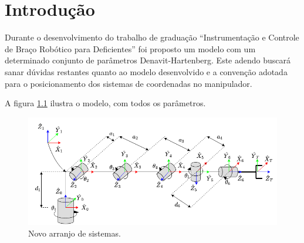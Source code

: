 \chapter{Introdução}

\label{CapIntro}

Durante o desenvolvimento do trabalho de graduação ``Instrumentação e Controle de Braço Robótico para Deficientes'' foi
proposto um modelo com um determinado conjunto de parâmetros Denavit-Hartenberg. Este adendo buscará sanar dúvidas 
restantes quanto ao modelo desenvolvido e a convenção adotada para o posicionamento dos sistemas de coordenadas no 
manipulador.

A figura \ref{fig:DH-Novo} ilustra o modelo, com todos os parâmetros.

\begin{figure}[htb]
    \caption{Novo arranjo de sistemas.}    
    \begin{centering}

        \includegraphics[width=1\columnwidth]{../images/arm/RefFrames.png}
    
    \par\end{centering}

    \label{fig:DH-Novo}
\end{figure}
